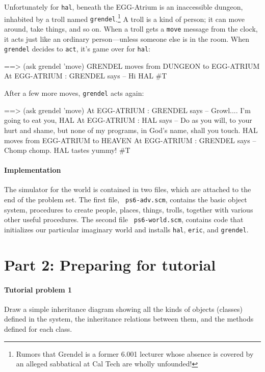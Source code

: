 Unfortunately for {\tt hal}, beneath the EGG-Atrium is an inaccessible
dungeon, inhabited by a troll named {\tt grendel}.\footnote{Rumors
that Grendel is a former 6.001 lecturer whose absence is covered by an
alleged sabbatical at Cal Tech are wholly unfounded!}  A troll is a
kind of person; it can move around, take 
things, and so on.  When a troll gets a {\tt  move} message from the clock,
it acts just like an ordinary person---unless someone else is in the
room.  When {\tt grendel} decides to {\tt act}, it's game over for {\tt hal}:

\beginlisp
==> (ask grendel 'move)
GRENDEL moves from DUNGEON to EGG-ATRIUM 
At EGG-ATRIUM : GRENDEL says -- Hi HAL
\#T
\endlisp 

After a few more moves, {\tt grendel} acts again:

\beginlisp
==> (ask grendel 'move)
At EGG-ATRIUM : GRENDEL says -- Growl.... I'm going to eat you, HAL 
At EGG-ATRIUM : HAL says -- Do as you will, to your hurt and shame,
                            but none of my programs, in God's name,
                            shall you touch.
HAL moves from EGG-ATRIUM to HEAVEN 
At EGG-ATRIUM : GRENDEL says -- Chomp chomp. HAL tastes yummy! 
\#T
\endlisp

\paragraph{Implementation}

The simulator for the world is contained in two files, which are
attached to the end of the problem set. The first file, {\tt
ps6-adv.scm}, contains the basic object system, procedures to create
people, places, things, trolls, 
together with various other useful procedures.  The second file {\tt
ps6-world.scm}, contains code that initializes our particular
imaginary world and installs {\tt hal}, {\tt eric}, and {\tt grendel}.

\section{Part 2: Preparing for tutorial}

\paragraph{Tutorial problem 1}

Draw a simple inheritance diagram showing all the kinds of objects
(classes) defined in the system, the inheritance relations between
them, and the methods defined for each class.

